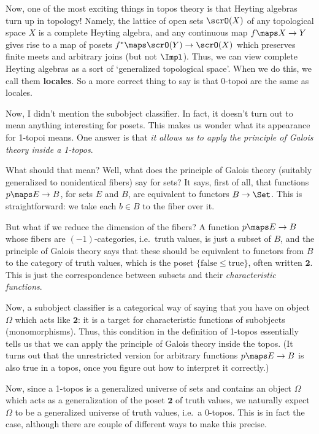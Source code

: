 \documentclass[12pt]{amsart}
\begin{document}
Now, one of the most exciting things in topos theory is that Heyting
algebras turn up in topology!  Namely, the lattice of open sets
$\scrO(X)$ of any topological space $X$ is a complete Heyting algebra,
and any continuous map $f\maps X\to Y$ gives rise to a map of posets
$f^*\maps \scrO(Y)\to \scrO(X)$ which preserves finite meets and
arbitrary joins (but not $\Impl$).  Thus, we can view complete Heyting
algebras as a sort of `generalized topological space'.  When we do
this, we call them \textbf{locales}.  So a more correct thing to say is
that 0-topoi are the same as locales.

Now, I didn't mention the subobject classifier.  In fact, it doesn't
turn out to mean anything interesting for posets.  This makes us
wonder what its appearance for 1-topoi means.  One answer is that
\emph{it allows us to apply the principle of Galois theory inside a
  1-topos}.

What should that mean?  Well, what does the principle of Galois theory
(suitably generalized to nonidentical fibers) say for sets?  It says,
first of all, that functions $p\maps E\to B$, for sets $E$ and $B$,
are equivalent to functors $B\to\Set$.  This is straightforward: we
take each $b\in B$ to the fiber over it.

But what if we reduce the dimension of the fibers?  A function $p\maps
E\to B$ whose fibers are $(-1)$-categories, i.e.\ truth values, is
just a subset of $B$, and the principle of Galois theory says that
these should be equivalent to functors from $B$ to the category of
truth values, which is the poset $\{\text{false} \le \text{true}\}$,
often written $\mathbf{2}$.  This is just the correspondence between
subsets and their \emph{characteristic functions}.

Now, a subobject classifier is a categorical way of saying that you
have on object $\Omega$ which acts like $\mathbf{2}$: it is a target
for characteristic functions of subobjects (monomorphisms).  Thus,
this condition in the definition of 1-topos essentially tells us that
we can apply the principle of Galois theory inside the topos.  (It
turns out that the unrestricted version for arbitrary functions
$p\maps E\to B$ is also true in a topos, once you figure out how to
interpret it correctly.)

Now, since a 1-topos is a generalized universe of sets and contains an
object $\Omega$ which acts as a generalization of the poset
$\mathbf{2}$ of truth values, we naturally expect $\Omega$ to be a
generalized universe of truth values, i.e.\ a 0-topos.  This is in
fact the case, although there are couple of different ways to make
this precise.
\end{document}
